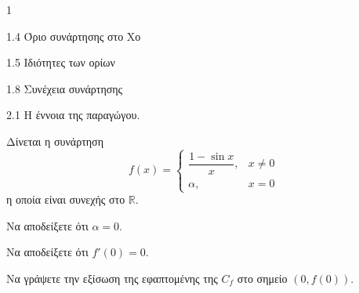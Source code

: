 \begin{ylh}{1}
    \item 1.4 Όριο συνάρτησης στο Χο
    \item 1.5 Ιδιότητες των ορίων
    \item 1.8 Συνέχεια συνάρτησης
    \item 2.1 Η έννοια της παραγώγου.
\end{ylh}
Δίνεται η συνάρτηση
\[
f(x) = \begin{cases}
    \dfrac{1 - \sin x}{x}, & x \neq 0 \\
    \alpha, & x = 0
\end{cases}
\]
η οποία είναι συνεχής στο $\mathbb{R}$.

\begin{alist}
    \item Να αποδείξετε ότι $\alpha = 0$. 
    \item Να αποδείξετε ότι $f'(0) = 0$. 
    \item Να γράψετε την εξίσωση της εφαπτομένης της $C_f$ στο σημείο $(0, f(0))$. 
\end{alist}
